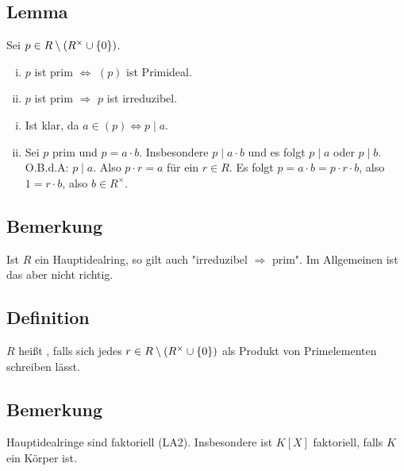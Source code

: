 \subsection[Lemma: Primelemente und Primideale; prim $\Rightarrow $ irreduzibel]{Lemma} %
\label{sub:76}
Sei $p \in R \setminus \enbrace*{R^\times \cup \{0\}} $.
\begin{enumerate}[i)]
	\item $p$ ist prim $\iff$ $(p)$ ist Primideal.
	\item $p$ ist prim $\Longrightarrow$ $p$ ist irreduzibel.
\end{enumerate}
\begin{enumerate}[i)]
	\item Ist klar, da $a \in (p) \iff p \mid a$.
	\item Sei $p$ prim und $p = a \cdot b$. Insbesondere $p \mid a \cdot b$ und es folgt $p \mid a$ oder $p \mid b$. O.B.d.A: $p \mid a$. Also $p \cdot r = a$ für ein 
	$r \in R$. Es folgt $p = a \cdot b = p \cdot r \cdot b$, also $1= r \cdot b$, also $b \in R^\times$. \bewende
\end{enumerate}

\subsection[Bemerkung: In Hauptidealringen ist prim und irreduzibel äquivalent]{Bemerkung} %
\label{sub:77}
Ist $R$ ein Hauptidealring, so gilt auch "{}irreduzibel $\Rightarrow$ prim"{}. Im Allgemeinen ist das aber nicht richtig.

\subsection[Definition: Faktorieller Ring]{Definition} %
\label{sub:78}
$R$ heißt , falls sich jedes $r \in R \setminus \enbrace*{R^\times \cup \{0\}} $ als Produkt von Primelementen schreiben lässt. 

\subsection[Bemerkung: Hauptidealringe sind faktoriell]{Bemerkung} %
\label{sub:79}
Hauptidealringe sind faktoriell (LA2). Insbesondere ist $K[X]$ faktoriell, falls $K$ ein Körper ist.

